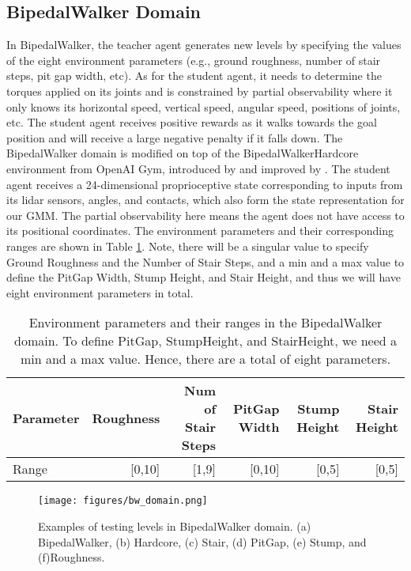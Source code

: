 \subsection{BipedalWalker Domain}
In BipedalWalker, the teacher agent generates new levels by specifying the values of the eight environment parameters (e.g., ground roughness, number of stair steps, pit gap width, etc). As for the student agent, it needs to determine the torques applied on its joints and is constrained by partial observability where it only knows its horizontal speed, vertical speed, angular speed, positions of joints, etc. The student agent receives positive rewards as it walks towards the goal position and will receive a large negative penalty if it falls down. 
The BipedalWalker domain is modified on top of the BipedalWalkerHardcore environment from OpenAI Gym, introduced by \cite{wang2019poet} and improved by \cite{portelas2020teacher,parker2022evolving}. The student agent receives a 24-dimensional proprioceptive state corresponding to inputs from its lidar sensors, angles, and contacts, which also form the state representation for our GMM. The partial observability here means the agent does not have access to its positional coordinates. The environment parameters and their corresponding ranges are shown in Table \ref{tab:env_params_bw}. Note, there will be a singular value to specify Ground Roughness and the Number of Stair Steps, and a min and a max value to define the PitGap Width, Stump Height, and Stair Height, and thus we will have eight environment parameters in total.

\begin{table}[h]
    \caption{Environment parameters and their ranges in the BipedalWalker domain. To define PitGap, StumpHeight, and StairHeight, we need a min and a max value. Hence, there are a total of eight parameters.}
    \label{tab:env_params_bw}
    \centering
    \begin{tabular}{lrrrrr}
        \toprule
        \textbf{Parameter} & Roughness & Num of Stair Steps & PitGap Width & Stump Height & Stair Height \\
        \midrule
        Range        & [0,10] & [1,9] & [0,10] & [0,5] & [0,5]         \\
        \bottomrule
    \end{tabular}
\end{table}

\begin{figure}[ht]
  \centering
  \texttt{[image: figures/bw\_domain.png]}
  \caption{Examples of testing levels in BipedalWalker domain. (a) BipedalWalker, (b) Hardcore, (c) Stair, (d) PitGap, (e) Stump, and (f)Roughness.}
  \label{fig:bw_domain}
\end{figure}

